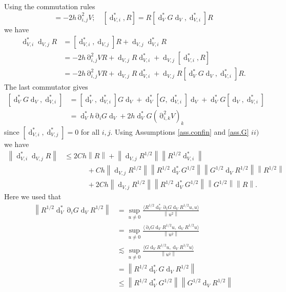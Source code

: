 \documentclass[12pt]{amsart}
\def\<{\langle}
\def\>{\rangle}
\renewcommand{\d}{\operatorname{d}}
\numberwithin{equation}{section}
\numberwithin{figure}{section}
\DeclareMathOperator{\p}{\partial}
\newcommand{\vvert}[1]{\left\lVert#1\right\rVert}
\begin{document}
Using the commutation rules
\begin{equation*}
[\d_{V,i}^*,\d_{V,j}] = -2h\p_{i,j}^2V;\quad [\d_{V,i}^*,R] = R[\d_V^*G\d_V,\d_{V,i}^*]R
\end{equation*}
we have
\begin{equation*}
\begin{split}
    \d_{V,i}^*\d_{V,j}R &= [\d_{V,i}^*,\d_{V,j}]R + \d_{V,j}\d_{V,i}^*R\\
    &= -2h\p_{i,j}^2VR + \d_{V,j}R\d_{V,i}^* + \d_{V,j}[\d_{V,i}^*,R]\\
    &= -2h\p_{i,j}^2VR + \d_{V,j}R\d_{V,i}^* + \d_{V,j}R[\d_V^*G\d_V,\d_{V,i}^*]R.
\end{split}
\end{equation*}
The last commutator gives
\begin{equation*}
\begin{split}
    [\d_V^*G\d_V,\d_{V,i}^*] &= [\d_V^*,\d_{V,i}^*]G\d_V + \d_V^*[G,\d_{V,i}^*]\d_V + \d_V^*G[\d_V,\d_{V,i}^*]\\
    &= \d_V^*h\p_iG\d_V + 2h\d_V^*G(\p_{i,k}^2V)_{k}
\end{split}
\end{equation*}
since $[\d_{V,i}^*,\d_{V,j}^*] = 0$ for all $i,j$. Using Assumptions \ref{ass.confin} and \ref{ass.G} $ii)$ we %
have
\begin{equation*}
\begin{split}
    \vvert{\d_{V,i}^*\d_{V,j}R} &\leq 2Ch\vvert{R} + \vvert{\d_{V,j}R^{1/2}}\vvert{R^{1/2}\d_{V,i}^*}\\
    &\phantom{*****} + Ch\vvert{\d_{V,j}R^{1/2}}\vvert{R^{1/2}\d_V^*G^{1/2}}\vvert{G^{1/2}\d_VR^{1/2}}\vvert{R^{1/2}}\\
    &\phantom{*****} + 2Ch\vvert{\d_{V,j}R^{1/2}}\vvert{R^{1/2}\d_V^*G^{1/2}}\vvert{G^{1/2}}\vvert{R}.
\end{split}
\end{equation*}
Here %
we used that
\begin{equation*}
\begin{split}
    \vvert{R^{1/2}\d_V^*\p_iG\d_VR^{1/2}} &= \sup_{u\neq0}\frac{\<R^{1/2}\d_V^*\p_iG\d_VR^{1/2}u,u\>}{\vvert{u^2}}\\
    &= \sup_{u\neq0}\frac{\<\p_iG\d_VR^{1/2}u,\d_VR^{1/2}u\>}{\vvert{u^2}}\\
    &\lesssim \sup_{u\neq0}\frac{\<G\d_VR^{1/2}u,\d_VR^{1/2}u\>}{\vvert{u^2}}\\
    &= \vvert{R^{1/2}\d_V^*G\d_VR^{1/2}}\\
    &\leq \vvert{R^{1/2}\d_V^*G^{1/2}}\vvert{G^{1/2}\d_VR^{1/2}}
\end{split}
\end{equation*}
\end{document}
